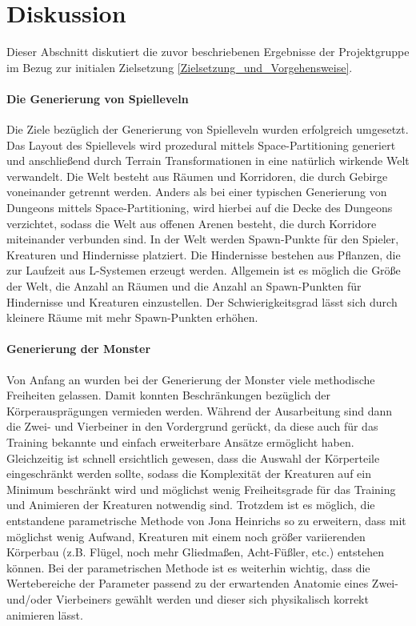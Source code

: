 \section{Diskussion}
\label{Diskussion}

Dieser Abschnitt diskutiert die zuvor beschriebenen Ergebnisse der Projektgruppe im Bezug zur initialen Zielsetzung \ref{Zielsetzung_und_Vorgehensweise}.

\paragraph{Die Generierung von Spielleveln}
Die Ziele bezüglich der Generierung von Spielleveln wurden erfolgreich umgesetzt.
Das Layout des Spiellevels wird prozedural mittels Space-Partitioning generiert und anschließend durch Terrain Transformationen in eine natürlich wirkende Welt verwandelt.
Die Welt besteht aus Räumen und Korridoren, die durch Gebirge voneinander getrennt werden.
Anders als bei einer typischen Generierung von Dungeons mittels Space-Partitioning, wird hierbei auf die Decke des Dungeons verzichtet, sodass die Welt aus offenen Arenen besteht, die durch Korridore miteinander verbunden sind.
In der Welt werden Spawn-Punkte für den Spieler, Kreaturen und Hindernisse platziert.
Die Hindernisse bestehen aus Pflanzen, die zur Laufzeit aus L-Systemen erzeugt werden.
Allgemein ist es möglich die Größe der Welt, die Anzahl an Räumen und die Anzahl an Spawn-Punkten für Hindernisse und Kreaturen einzustellen.
Der Schwierigkeitsgrad lässt sich durch kleinere Räume mit mehr Spawn-Punkten erhöhen.

\paragraph{Generierung der Monster}
Von Anfang an wurden bei der Generierung der Monster viele methodische Freiheiten gelassen. Damit konnten Beschränkungen bezüglich der Körperausprägungen vermieden werden. Während der Ausarbeitung sind dann die Zwei- und Vierbeiner in den Vordergrund gerückt, da diese auch für das Training bekannte und einfach erweiterbare Ansätze ermöglicht haben. Gleichzeitig ist schnell ersichtlich gewesen, dass die Auswahl der Körperteile eingeschränkt werden sollte, sodass die Komplexität der Kreaturen auf ein Minimum beschränkt wird und möglichst wenig Freiheitsgrade für das Training und Animieren der Kreaturen notwendig sind. Trotzdem ist es möglich, die entstandene parametrische Methode von Jona Heinrichs so zu erweitern, dass mit möglichst wenig Aufwand, Kreaturen mit einem noch größer variierenden Körperbau (z.B. Flügel, noch mehr Gliedmaßen, Acht-Füßler, etc.) entstehen können. Bei der parametrischen Methode ist es weiterhin wichtig, dass die Wertebereiche der Parameter passend zu der erwartenden Anatomie eines Zwei- und/oder Vierbeiners gewählt werden und dieser sich physikalisch korrekt animieren lässt.

